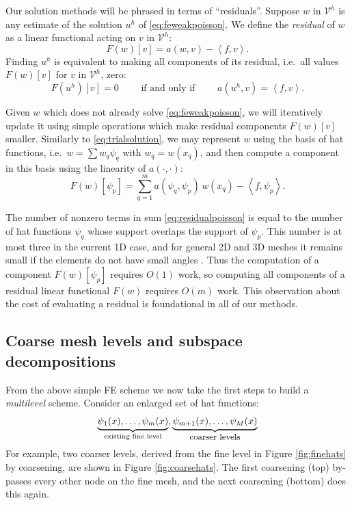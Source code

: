 \documentclass[letterpaper,final,12pt,reqno]{amsart}
\theoremstyle{claim}
\newcommand{\ip}[2]{\left<#1,#2\right>}
\numberwithin{equation}{section}
\numberwithin{figure}{section}
\numberwithin{table}{section}
\numberwithin{theorem}{section}
\begin{document}
Our solution methods will be phrased in terms of ``residuals''.  Suppose $w$ in $\mathcal{V}^h$ is any estimate of the solution $u^h$ of \eqref{eq:feweakpoisson}.  We define the \emph{residual} of $w$ as a linear functional acting on $v$ in $\mathcal{V}^h$:
\begin{equation}
  F(w)[v] = a(w,v) - \ip{f}{v}.  \label{eq:residual}
\end{equation}
Finding $u^h$ is equivalent to making all components of its residual, i.e.~all values $F(w)[v]$ for $v$ in $\mathcal{V}^h$, zero:
\begin{equation}
  F(u^h)[v]=0 \qquad \text{ if and only if } \qquad a(u^h,v)=\ip{f}{v}. \label{eq:residualweakequivalence}
\end{equation}

Given $w$ which does not already solve \eqref{eq:feweakpoisson}, we will iteratively update it using simple operations which make residual components $F(w)[v]$ smaller.  Similarly to \eqref{eq:trialsolution}, we may represent $w$ using the basis of hat functions, i.e.~$w = \sum w_q \psi_q$ with $w_q = w(x_q)$, and then compute a component in this basis using the linearity of $a(\cdot,\cdot)$:
\begin{equation}
  F(w)[\psi_p] = \sum_{q=1}^{m} a(\psi_q,\psi_p) \,w(x_q) - \ip{f}{\psi_p}.  \label{eq:residualpoisson}
\end{equation}

The number of nonzero terms in sum \eqref{eq:residualpoisson} is equal to the number of hat functions $\psi_q$ whose support overlaps the support of $\psi_p$.  This number is at most three in the current 1D case, and for general 2D and 3D meshes it remains small if the elements do not have small angles \cite{Braess2007}.  Thus the computation of a component $F(w)[\psi_p]$ requires $O(1)$ work, so computing all components of a residual linear functional $F(w)$ requires $O(m)$ work.  This observation about the cost of evaluating a residual is foundational in all of our methods.

\subsection*{Coarse mesh levels and subspace decompositions}  From the above simple FE scheme we now take the first steps to build a \emph{multilevel} scheme.  Consider an enlarged set of hat functions:
    $$\underbrace{\psi_1(x),\dots,\psi_m(x)}_{\text{existing fine level}},\underbrace{\psi_{m+1}(x),\dots,\psi_M(x)}_{\text{\small coarser levels}}$$
For example, two coarser levels, derived from the fine level in Figure \ref{fig:finehats} by coarsening, are shown in Figure \ref{fig:coarsehats}.  The first coarsening (top) by-passes every other node on the fine mesh, and the next coarsening (bottom) does this again.
\end{document}
